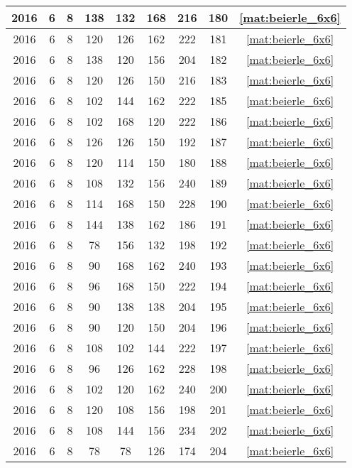 \begin{longtable}{|c|c|c|c|c|c|c|c|c|}
2016 & 6 & 8 & 138 & 132 & 168 & 216 & 180 & \eqref{mat:beierle_6x6} \\ \hline 
2016 & 6 & 8 & 120 & 126 & 162 & 222 & 181 & \eqref{mat:beierle_6x6} \\ \hline 
2016 & 6 & 8 & 138 & 120 & 156 & 204 & 182 & \eqref{mat:beierle_6x6} \\ \hline 
2016 & 6 & 8 & 120 & 126 & 150 & 216 & 183 & \eqref{mat:beierle_6x6} \\ \hline 
2016 & 6 & 8 & 102 & 144 & 162 & 222 & 185 & \eqref{mat:beierle_6x6} \\ \hline 
2016 & 6 & 8 & 102 & 168 & 120 & 222 & 186 & \eqref{mat:beierle_6x6} \\ \hline 
2016 & 6 & 8 & 126 & 126 & 150 & 192 & 187 & \eqref{mat:beierle_6x6} \\ \hline 
2016 & 6 & 8 & 120 & 114 & 150 & 180 & 188 & \eqref{mat:beierle_6x6} \\ \hline 
2016 & 6 & 8 & 108 & 132 & 156 & 240 & 189 & \eqref{mat:beierle_6x6} \\ \hline 
2016 & 6 & 8 & 114 & 168 & 150 & 228 & 190 & \eqref{mat:beierle_6x6} \\ \hline 
2016 & 6 & 8 & 144 & 138 & 162 & 186 & 191 & \eqref{mat:beierle_6x6} \\ \hline 
2016 & 6 & 8 & 78 & 156 & 132 & 198 & 192 & \eqref{mat:beierle_6x6} \\ \hline 
2016 & 6 & 8 & 90 & 168 & 162 & 240 & 193 & \eqref{mat:beierle_6x6} \\ \hline 
2016 & 6 & 8 & 96 & 168 & 150 & 222 & 194 & \eqref{mat:beierle_6x6} \\ \hline 
2016 & 6 & 8 & 90 & 138 & 138 & 204 & 195 & \eqref{mat:beierle_6x6} \\ \hline 
2016 & 6 & 8 & 90 & 120 & 150 & 204 & 196 & \eqref{mat:beierle_6x6} \\ \hline 
2016 & 6 & 8 & 108 & 102 & 144 & 222 & 197 & \eqref{mat:beierle_6x6} \\ \hline 
2016 & 6 & 8 & 96 & 126 & 162 & 228 & 198 & \eqref{mat:beierle_6x6} \\ \hline 
2016 & 6 & 8 & 102 & 120 & 162 & 240 & 200 & \eqref{mat:beierle_6x6} \\ \hline 
2016 & 6 & 8 & 120 & 108 & 156 & 198 & 201 & \eqref{mat:beierle_6x6} \\ \hline 
2016 & 6 & 8 & 108 & 144 & 156 & 234 & 202 & \eqref{mat:beierle_6x6} \\ \hline 
2016 & 6 & 8 & 78 & 78 & 126 & 174 & 204 & \eqref{mat:beierle_6x6} \\ \hline 

\end{longtable}

